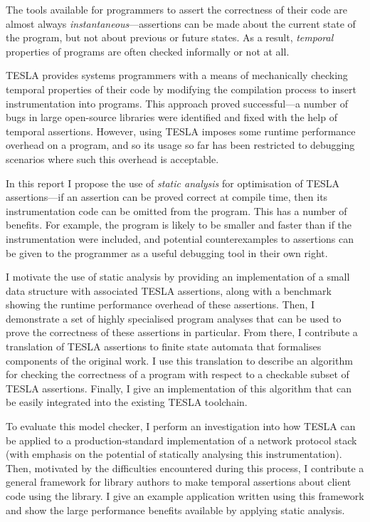 The tools available for programmers to assert the correctness of their
code are almost always \emph{instantaneous}---assertions can be made
about the current state of the program, but not about previous or future
states. As a result, \emph{temporal} properties of programs are often
checked informally or not at all.

TESLA \cite{anderson_tesla:_2014} provides systems programmers with a
means of mechanically checking temporal properties of their code by
modifying the compilation process to insert instrumentation into
programs. This approach proved successful---a number of bugs in large
open-source libraries were identified and fixed with the help of
temporal assertions. However, using TESLA imposes some runtime
performance overhead on a program, and so its usage so far has been
restricted to debugging scenarios where such this overhead is
acceptable.

In this report I propose the use of \emph{static analysis} for
optimisation of TESLA assertions---if an assertion can be proved correct
at compile time, then its instrumentation code can be omitted from the
program. This has a number of benefits. For example, the program is
likely to be smaller and faster than if the instrumentation were
included, and potential counterexamples to assertions can be given to
the programmer as a useful debugging tool in their own right.

I motivate the use of static analysis by providing an implementation of
a small data structure with associated TESLA assertions, along with a
benchmark showing the runtime performance overhead of these assertions.
Then, I demonstrate a set of highly specialised program analyses that
can be used to prove the correctness of these assertions in particular.
From there, I contribute a translation of TESLA assertions to finite
state automata that formalises components of the original work. I use
this translation to describe an algorithm for checking the correctness
of a program with respect to a checkable subset of TESLA assertions.
Finally, I give an implementation of this algorithm that can be easily
integrated into the existing TESLA toolchain.

To evaluate this model checker, I perform an investigation into how
TESLA can be applied to a production-standard implementation of a
network protocol stack (with emphasis on the potential of statically
analysing this instrumentation). Then, motivated by the difficulties
encountered during this process, I contribute a general framework for
library authors to make temporal assertions about client code using the
library. I give an example application written using this framework and
show the large performance benefits available by applying static
analysis.

